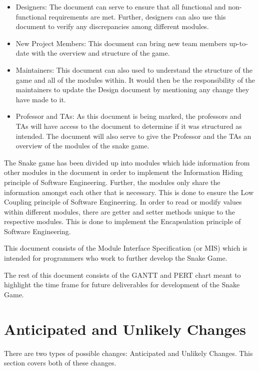 \documentclass[12pt]{article}
\begin{document}
\begin{itemize}
\item Designers: The document can serve to ensure that all functional and non-functional requirements are met. Further, designers can also use this document to verify any discrepancies among different modules.

\item New Project Members: This document can bring new team members up-to-date with the overview and structure of the game.

\item Maintainers: This document can also used to understand the structure of the game and all of the modules within. It would then be the responsibility of the maintainers to update the Design document by mentioning any change they have made to it.

\item Professor and TAs: As this document is being marked, the professors and TAs will have access to the document to determine if it was structured as intended. The document will also serve to give the Professor and the TAs an overview of the modules of the snake game.
\end{itemize}

The Snake game has been divided up into modules which hide information from other modules in the document in order to implement the Information Hiding principle of Software Engineering. Further, the modules only share the information amongst each other that is necessary. This is done to ensure the Low Coupling principle of Software Engineering. In order to read or modify values within different modules, there are getter and setter methods unique to the respective modules. This is done to implement the Encapsulation principle of Software Engineering.

This document consists of the Module Interface Specification (or MIS) which is intended for programmers who work to further develop the Snake Game.

The rest of this document consists of the GANTT and PERT chart meant to highlight the time frame for future deliverables for development of the Snake Game.

\section{Anticipated and Unlikely Changes} \label{SecChange}

There are two types of possible changes: Anticipated and Unlikely Changes. This section covers both of these changes.
\end{document}
